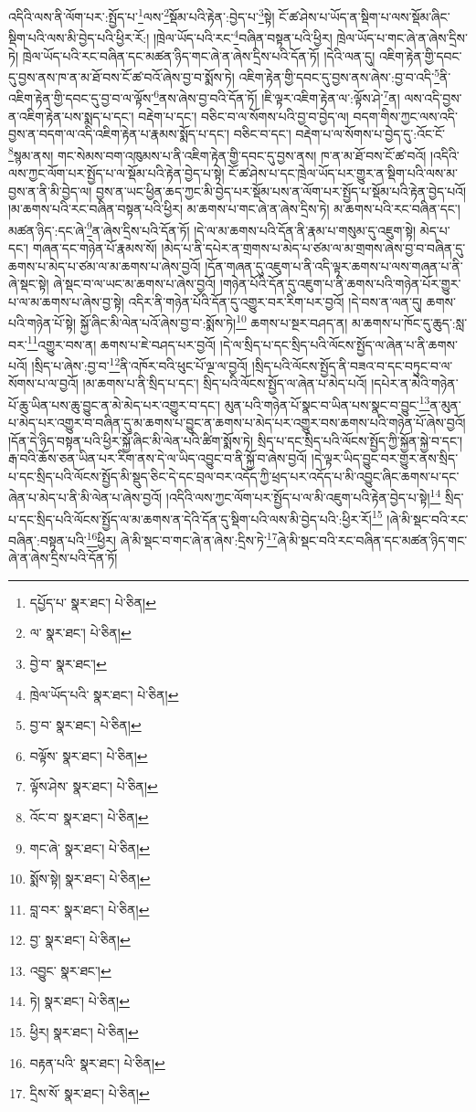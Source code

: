 འདིའི་ལས་ནི་ལོག་པར་:སྤྱོད་པ་\footnote{དཔྱོད་པ་  སྣར་ཐང་།  པེ་ཅིན། }ལས་\footnote{ལ་  སྣར་ཐང་།  པེ་ཅིན། }སྡོམ་པའི་རྟེན་:བྱེད་པ་\footnote{བྱེ་བ་  སྣར་ཐང་། }སྟེ། ངོ་ཚ་ཤེས་པ་ཡོད་ན་སྡིག་པ་ལས་སྡོམ་ཞིང་སྡིག་པའི་ལས་མི་བྱེད་པའི་ཕྱིར་རོ:། །ཁྲེལ་ཡོད་པའི་རང་\footnote{ཁྲེལ་ཡོད་པའི་  སྣར་ཐང་།  པེ་ཅིན། }བཞིན་བསྟན་པའི་ཕྱིར། ཁྲེལ་ཡོད་པ་གང་ཞེ་ན་ཞེས་དྲིས་ཏེ། ཁྲེལ་ཡོད་པའི་རང་བཞིན་དང་མཚན་ཉིད་གང་ཞེ་ན་ཞེས་དྲིས་པའི་དོན་ཏོ། །དེའི་ལན་དུ། འཇིག་རྟེན་གྱི་དབང་དུ་བྱས་ནས་ཁ་ན་མ་ཐོ་བས་ངོ་ཚ་བའོ་ཞེས་བྱ་བ་སྨོས་ཏེ། འཇིག་རྟེན་གྱི་དབང་དུ་བྱས་ནས་ཞེས་:བྱ་བ་འདི་\footnote{བྱ་བ་  སྣར་ཐང་།  པེ་ཅིན། }ནི་འཇིག་རྟེན་གྱི་དབང་དུ་བྱ་བ་ལ་ལྟོས་\footnote{བལྟོས་  སྣར་ཐང་།  པེ་ཅིན། }ནས་ཞེས་བྱ་བའི་དོན་ཏོ། །ཇི་ལྟར་འཇིག་རྟེན་ལ་:ལྟོས་ཤེ་\footnote{ལྟོས་ཤེས་  སྣར་ཐང་།  པེ་ཅིན། }ན། ལས་འདི་བྱས་ན་འཇིག་རྟེན་པས་སྨད་པ་དང་། བརྡེག་པ་དང་། བཅིང་བ་ལ་སོགས་པའི་བྱ་བ་བྱེད་ལ། བདག་གིས་ཀྱང་ལས་འདི་བྱས་ན་བདག་ལ་འདི་འཇིག་རྟེན་པ་རྣམས་སྨོད་པ་དང་། བཅིང་བ་དང་། བརྡེག་པ་ལ་སོགས་པ་བྱེད་དུ་:འོང་ངོ་\footnote{འོང་བ་  སྣར་ཐང་།  པེ་ཅིན། }སྙམ་ནས། གང་སེམས་བག་འཁུམས་པ་ནི་འཇིག་རྟེན་གྱི་དབང་དུ་བྱས་ནས། ཁ་ན་མ་ཐོ་བས་ངོ་ཚ་བའོ། །འདིའི་ལས་ཀྱང་ལོག་པར་སྤྱོད་པ་ལ་སྡོམ་པའི་རྟེན་བྱེད་པ་སྟེ། ངོ་ཚ་ཤེས་པ་དང་ཁྲེལ་ཡོད་པར་གྱུར་ན་སྡིག་པའི་ལས་མ་བྱས་ན་ནི་མི་བྱེད་ལ། བྱས་ན་ཡང་ཕྱིན་ཆད་ཀྱང་མི་བྱེད་པར་སྡོམ་པས་ན་ལོག་པར་སྤྱོད་པ་སྡོམ་པའི་རྟེན་བྱེད་པའོ། །མ་ཆགས་པའི་རང་བཞིན་བསྟན་པའི་ཕྱིར། མ་ཆགས་པ་གང་ཞེ་ན་ཞེས་དྲིས་ཏེ། མ་ཆགས་པའི་རང་བཞིན་དང་། མཚན་ཉིད་:དང་ཞེ་\footnote{གང་ཞེ་  སྣར་ཐང་།  པེ་ཅིན། }ན་ཞེས་དྲིས་པའི་དོན་ཏོ། །དེ་ལ་མ་ཆགས་པའི་དོན་ནི་རྣམ་པ་གསུམ་དུ་འཇུག་སྟེ། མེད་པ་དང་། གཞན་དང་གཉེན་པོ་རྣམས་སོ། །མེད་པ་ནི་དཔེར་ན་གྲགས་པ་མེད་པ་ཙམ་ལ་མ་གྲགས་ཞེས་བྱ་བ་བཞིན་དུ་ཆགས་པ་མེད་པ་ཙམ་ལ་མ་ཆགས་པ་ཞེས་བྱའོ། །དོན་གཞན་དུ་འཇུག་པ་ནི་འདི་ལྟར་ཆགས་པ་ལས་གཞན་པ་ནི་ཞེ་སྡང་སྟེ། ཞེ་སྡང་བ་ལ་ཡང་མ་ཆགས་པ་ཞེས་བྱའོ། །གཉེན་པོའི་དོན་དུ་འཇུག་པ་ནི་ཆགས་པའི་གཉེན་པོར་གྱུར་པ་ལ་མ་ཆགས་པ་ཞེས་བྱ་སྟེ། འདིར་ནི་གཉེན་པོའི་དོན་དུ་འགྱུར་བར་རིག་པར་བྱའོ། །དེ་བས་ན་ལན་དུ། ཆགས་པའི་གཉེན་པོ་སྟེ། སྐྱོ་ཞིང་མི་ལེན་པའོ་ཞེས་བྱ་བ་:སྨོས་ཏེ།\footnote{སྨོས་སྟེ།  སྣར་ཐང་།  པེ་ཅིན། } ཆགས་པ་སྔར་བཤད་ན། མ་ཆགས་པ་ཁོང་དུ་ཆུད་:སླ་བར་\footnote{བླ་བར་  སྣར་ཐང་།  པེ་ཅིན། }འགྱུར་བས་ན། ཆགས་པ་ཇེ་བཤད་པར་བྱའོ། །དེ་ལ་སྲིད་པ་དང་སྲིད་པའི་ལོངས་སྤྱོད་ལ་ཞེན་པ་ནི་ཆགས་པའོ། །སྲིད་པ་ཞེས་:བྱ་བ་\footnote{བྱ་  སྣར་ཐང་།  པེ་ཅིན། }ནི་འཁོར་བའི་ཕུང་པོ་ལྔ་ལ་བྱའོ། །སྲིད་པའི་ལོངས་སྤྱོད་ནི་བཟའ་བ་དང་བཏུང་བ་ལ་སོགས་པ་ལ་བྱའོ། །མ་ཆགས་པ་ནི་སྲིད་པ་དང་། སྲིད་པའི་ལོངས་སྤྱོད་ལ་ཞེན་པ་མེད་པའོ། །དཔེར་ན་མེའི་གཉེན་པོ་ཆུ་ཡིན་པས་ཆུ་བྱུང་ན་མེ་མེད་པར་འགྱུར་བ་དང་། མུན་པའི་གཉེན་པོ་སྣང་བ་ཡིན་པས་སྣང་བ་བྱུང་\footnote{འབྱུང་  སྣར་ཐང་། }ན་མུན་པ་མེད་པར་འགྱུར་བ་བཞིན་དུ་མ་ཆགས་པ་བྱུང་ན་ཆགས་པ་མེད་པར་འགྱུར་བས་ཆགས་པའི་གཉེན་པོ་ཞེས་བྱའོ། །དོན་དེ་ཉིད་བསྟན་པའི་ཕྱིར་སྐྱོ་ཞིང་མི་ལེན་པའི་ཚིག་སྨོས་ཏེ། སྲིད་པ་དང་སྲིད་པའི་ལོངས་སྤྱོད་ཀྱི་སྐྱོན་སྐྱེ་བ་དང་། རྒ་བའི་ཆོས་ཅན་ཡིན་པར་རིག་ནས་དེ་ལ་ཡིད་འབྱུང་བ་ནི་སྐྱོ་བ་ཞེས་བྱའོ། །དེ་ལྟར་ཡིད་བྱུང་བར་གྱུར་ནས་སྲིད་པ་དང་སྲིད་པའི་ལོངས་སྤྱོད་མི་སྡུད་ཅིང་དེ་དང་བྲལ་བར་འདོད་ཀྱི་ཕྲད་པར་འདོད་པ་མི་འབྱུང་ཞིང་ཆགས་པ་དང་ཞེན་པ་མེད་པ་ནི་མི་ལེན་པ་ཞེས་བྱའོ། །འདིའི་ལས་ཀྱང་ལོག་པར་སྤྱོད་པ་ལ་མི་འཇུག་པའི་རྟེན་བྱེད་པ་སྟེ།\footnote{ཏེ།  སྣར་ཐང་།  པེ་ཅིན། } སྲིད་པ་དང་སྲིད་པའི་ལོངས་སྤྱོད་ལ་མ་ཆགས་ན་དེའི་དོན་དུ་སྡིག་པའི་ལས་མི་བྱེད་པའི་:ཕྱིར་རོ།\footnote{ཕྱིར།  སྣར་ཐང་།  པེ་ཅིན། } །ཞེ་མི་སྡང་བའི་རང་བཞིན་:བསྟན་པའི་\footnote{བརྟན་པའི་  སྣར་ཐང་།  པེ་ཅིན། }ཕྱིར། ཞེ་མི་སྡང་བ་གང་ཞེ་ན་ཞེས་:དྲིས་ཏེ་\footnote{དྲིས་སོ་  སྣར་ཐང་།  པེ་ཅིན། }ཞེ་མི་སྡང་བའི་རང་བཞིན་དང་མཚན་ཉིད་གང་ཞེ་ན་ཞེས་དྲིས་པའི་དོན་ཏོ། 